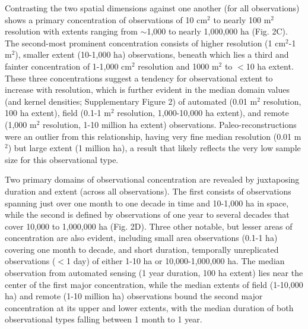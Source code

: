 \documentclass[12pt]{article}
\begin{document}
Contrasting the two spatial dimensions against one another (for all observations) shows a primary concentration of observations of 10 cm$^2$ to nearly 100 m$^2$ resolution with extents ranging from $\sim$1,000 to nearly 1,000,000 ha (Fig. 2C). The second-most prominent concentration consists of higher resolution (1 cm$^2$-1 m$^2$), smaller extent (10-1,000 ha) observations, beneath which lies a third and fainter concentration of 1-1,000 cm$^2$ resolution and 1000 m$^2$ to $<$10 ha extent. These three concentrations suggest a tendency for observational extent to increase with resolution, which is further evident in the median domain values (and kernel densities; Supplementary Figure 2) of automated (0.01 m$^2$ resolution, 100 ha extent), field (0.1-1 m$^2$ resolution, 1,000-10,000 ha extent), and remote (1,000 m$^2$ resolution, 1-10 million ha extent) observations.  Paleo-reconstructions were an outlier from this relationship, having very fine median resolution (0.01 m$^2$) but large extent (1 million ha), a result that likely reflects the very low sample size for this observational type. 

Two primary domains of observational concentration are revealed by juxtaposing duration and extent (across all observations). The first consists of observations spanning just over one month to one decade in time and 10-1,000 ha in space, while the second is defined by observations of one year to several decades that cover 10,000 to 1,000,000 ha (Fig. 2D).  Three other notable, but lesser areas of concentration are also evident, including small area observations (0.1-1 ha) covering one month to decade, and short duration, temporally unreplicated observations ($<$1 day) of either 1-10 ha or 10,000-1,000,000 ha.  The median observation from automated sensing (1 year duration, 100 ha extent) lies near the center of the first major concentration, while the median extents of field (1-10,000 ha) and remote (1-10 million ha) observations bound the second major concentration at its upper and lower extents, with the median duration of both observational types falling between 1 month to 1 year. 
\end{document}
